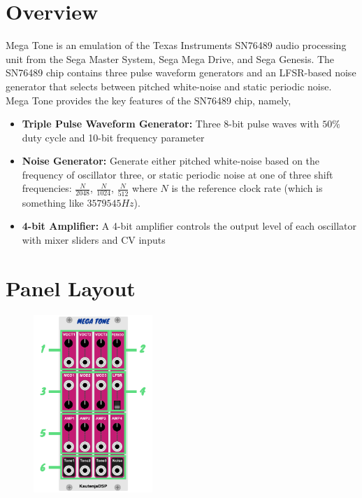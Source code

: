 \documentclass[12pt,letter]{article}
\begin{document}


\section{Overview}

Mega Tone is an emulation of the Texas Instruments SN76489 audio processing unit from the Sega Master System, Sega Mega Drive, and Sega Genesis. The SN76489 chip contains three pulse waveform generators and an LFSR-based noise generator that selects between pitched white-noise and static periodic noise. Mega Tone provides the key features of the SN76489 chip, namely,
\begin{itemize}
  \item \textbf{Triple Pulse Waveform Generator:} Three 8-bit pulse waves with $50\%$ duty cycle and 10-bit frequency parameter
  \item \textbf{Noise Generator:} Generate either pitched white-noise based on the frequency of oscillator three, or static periodic noise at one of three shift frequencies: $\frac{N}{2048}$, $\frac{N}{1024}$, $\frac{N}{512}$ where $N$ is the reference clock rate (which is something like $3579545Hz$).
  \item \textbf{4-bit Amplifier:} A 4-bit amplifier controls the output level of each oscillator with mixer sliders and CV inputs
\end{itemize}


\section{Panel Layout}

\begin{figure}[!htp]
\centering
\includegraphics[width=0.4\textwidth]{MegaTone-Manual}
\end{figure}
\end{document}
